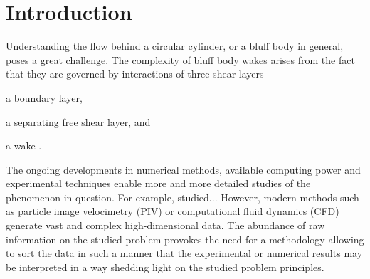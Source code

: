 \clearpage
\section{Introduction}
\label{sec:intro}
Understanding the flow behind a circular cylinder, or a bluff body in general, poses a great challenge. The complexity of bluff body wakes arises from the fact that they are governed by interactions of three shear layers
\begin{inparaenum}[(i)]
        \item a boundary layer,
        \item a separating free shear layer, and
        \item a wake \citep{williamson1996}. 
\end{inparaenum}


The ongoing developments in numerical methods, available computing power and experimental techniques enable more and more detailed studies of the phenomenon in question. For example, \noteTH{\citet{}} studied... However, modern methods such as particle image velocimetry (PIV) or computational fluid dynamics (CFD) generate vast and complex high-dimensional data. The abundance of raw information on the studied problem provokes the need for a methodology allowing to sort the data in {such} a manner {that} the experimental or numerical results may be interpreted in a way shedding light on the studied problem principles.

